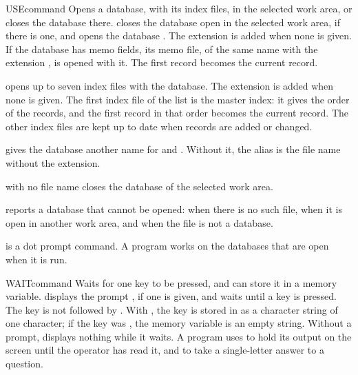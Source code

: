 \begin{XbaseEntry}{USE}{command}
Opens a database, with its index files, in the selected work area, or closes
the database there.
\Syntax
{}
\Usage
{}  closes the database open in the selected work area, if
there is one, and opens the database .  The extension  is
added when none is given.  If the database has memo fields, its memo file, of
the same name with the extension , is opened with it.  The first
record becomes the current record.

 opens up to seven index files with the database.  The extension
 is added when none is given.  The first index file of the list is
the master index: it gives the order of the records, and the first record in
that order becomes the current record.  The other index files are kept up to
date when records are added or changed.

 gives the database another name for  and .
Without it, the alias is the file name without the extension.

 with no file name closes the database of the selected work area.

 reports a database that cannot be opened:  when there is no such file,  when it is
open in another work area, and  when the file
is not a database.

 is a dot prompt command.  A program works on the databases that are
open when it is run.
\Examples
{}
\end{XbaseEntry}

\begin{XbaseEntry}{WAIT}{command}
Waits for one key to be pressed, and can store it in a memory variable.
\Syntax
{}
\Usage
{} displays the prompt , if one is given, and waits until a key
is pressed.  The key is not followed by .  With , the key is
stored in  as a character string of one character; if the key was
, the memory variable is an empty string.  Without a prompt,
 displays nothing while it waits.
\Tips
A program uses  to hold its output on the screen until the operator
has read it, and to take a single-letter answer to a question.
\Examples
{}
\end{XbaseEntry}

